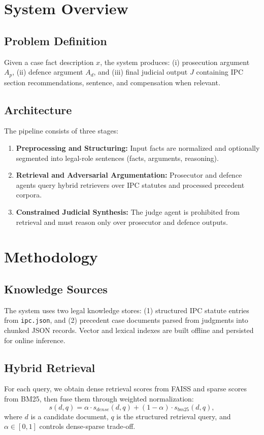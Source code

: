 \documentclass[conference]{IEEEtran}
\begin{document}
\section{System Overview}
\subsection{Problem Definition}
Given a case fact description $x$, the system produces: (i) prosecution argument $A_p$, (ii) defence argument $A_d$, and (iii) final judicial output $J$ containing IPC section recommendations, sentence, and compensation when relevant.

\subsection{Architecture}
The pipeline consists of three stages:
\begin{enumerate}
\item \textbf{Preprocessing and Structuring:} Input facts are normalized and optionally segmented into legal-role sentences (facts, arguments, reasoning).
\item \textbf{Retrieval and Adversarial Argumentation:} Prosecutor and defence agents query hybrid retrievers over IPC statutes and processed precedent corpora.
\item \textbf{Constrained Judicial Synthesis:} The judge agent is prohibited from retrieval and must reason only over prosecutor and defence outputs.
\end{enumerate}

\section{Methodology}
\subsection{Knowledge Sources}
The system uses two legal knowledge stores: (1) structured IPC statute entries from \texttt{ipc.json}, and (2) precedent case documents parsed from judgments into chunked JSON records. Vector and lexical indexes are built offline and persisted for online inference.

\subsection{Hybrid Retrieval}
For each query, we obtain dense retrieval scores from FAISS and sparse scores from BM25, then fuse them through weighted normalization:
\begin{equation}
s(d, q) = \alpha \cdot s_{dense}(d, q) + (1-\alpha) \cdot s_{bm25}(d, q),
\end{equation}
where $d$ is a candidate document, $q$ is the structured retrieval query, and $\alpha \in [0,1]$ controls dense-sparse trade-off.
\end{document}
